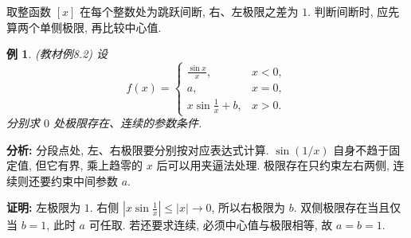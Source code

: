 \documentclass[UTF8,openany]{ctexbook}
\theoremstyle{chinesetextbook}
\newtheorem{example}{例}[section]
\newenvironment{cnproof}{\par\indent\textbf{证明:} \ignorespaces}{\par}
\begin{document}
取整函数 $[x]$ 在每个整数处为跳跃间断, 右、左极限之差为 $1$. 判断间断时, 应先算两个单侧极限, 再比较中心值.
\begin{example}
(教材例8.2) 设
\[
f(x)=\begin{cases}\frac{\sin x}{x},&x<0,\\a,&x=0,\\x\sin\frac1x+b,&x>0.\end{cases}
\]
分别求 $0$ 处极限存在、连续的参数条件.
\end{example}
\par\indent\textbf{分析:} 分段点处, 左、右极限要分别按对应表达式计算. $\sin(1/x)$ 自身不趋于固定值, 但它有界, 乘上趋零的 $x$ 后可以用夹逼法处理. 极限存在只约束左右两侧, 连续则还要约束中间参数 $a$.
\begin{cnproof}
左极限为 $1$. 右侧 $\displaystyle |x\sin\frac1x|\le|x|\to0$, 所以右极限为 $b$. 双侧极限存在当且仅当 $b=1$, 此时 $a$ 可任取. 若还要求连续, 必须中心值与极限相等, 故 $a=b=1$.
\end{cnproof}
\end{document}
